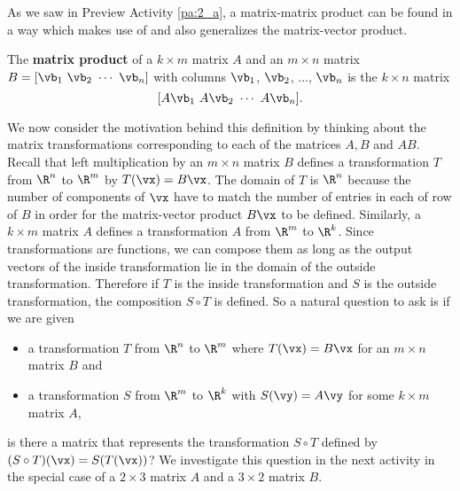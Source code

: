 \label{sec:mtx_prod}

As we saw in Preview Activity \ref{pa:2_a}, a matrix-matrix product can be found in a way which makes use of and also generalizes the matrix-vector product.



\begin{definition} The \textbf{matrix product} of a $k \times m$ matrix $A$ and an $m \times n$ matrix $B = [\vb_1 \ \vb_2 \ \cdots \ \vb_n]$ with columns $\vb_1$, $\vb_2$, $\ldots$, $\vb_n$ is the $k \times n$ matrix
\[[A\vb_1 \ A\vb_2 \ \cdots \ A\vb_n].\]
\end{definition}



We now consider the motivation behind this definition by thinking about the matrix transformations corresponding to each of the matrices $A, B$ and $AB$.
Recall that left multiplication by an $m \times n$ matrix $B$ defines a transformation $T$ from $\R^n$ to $\R^m$ by $T(\vx)=B\vx$. The domain of $T$ is $\R^n$ because the number of components of $\vx$ have to match the number of entries in each of row of $B$ in order for the matrix-vector product $B\vx$ to be defined. Similarly, a $k \times m$ matrix $A$ defines a transformation $A$ from $\R^m$ to $\R^k$. Since transformations are functions, we can compose them as long as the output vectors of the inside transformation lie in the domain of the outside transformation. Therefore if $T$ is the inside transformation and $S$ is the outside transformation, the composition $S\circ T$ is defined. So a natural question to ask is if we are given
\begin{itemize}
\item a transformation $T$ from $\R^n$ to $\R^m$ where $T(\vx) = B \vx$ for an $m \times n$ matrix $B$ and
\item a transformation $S$ from $\R^m$ to $\R^k$ with $S(\vy) = A \vy$ for some $k \times m$ matrix $A$,
\end{itemize}
is there a matrix that represents the transformation $S \circ T$ defined by $(S\circ T)(\vx)=S(T(\vx))$? We investigate this question in the next activity in the special case of a $2\times 3$ matrix $A$ and a $3\times 2$ matrix $B$.

